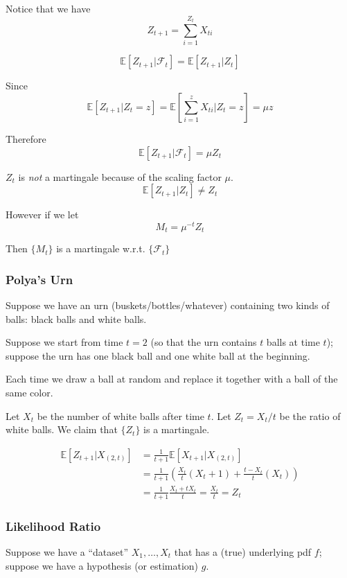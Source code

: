         Notice that we have
        \[ Z_{t+1} = \sum_{i=1}^{Z_t}X_{ti} \]

        \[ \mathbb{E}[Z_{t+1}|\mathcal{F}_t] = \mathbb{E}[Z_{t+1}|Z_t] \]

        Since
        \[ \mathbb{E}[Z_{t+1}|Z_t=z] = \mathbb{E}[\sum_{i=1}^zX_{ti}|Z_t=z] = \mu z \]

        Therefore
        \[ \mathbb{E}[Z_{t+1}|\mathcal{F}_t] = \mu Z_t \]

        $Z_t$ is \emph{not} a martingale because of the scaling factor $\mu$.
        \[ \mathbb{E}[Z_{t+1}|Z_t] \neq Z_t \]

        However if we let
        \[ M_t = \mu^{-t}Z_t \]

        Then $\{M_t\}$ is a martingale w.r.t. $\{\mathcal{F}_t\}$

        \subsubsection{Polya's Urn}
        Suppose we have an urn (buskets/bottles/whatever) containing two kinds of balls: black balls and white balls.
        
        Suppose we start from time $t=2$ (so that the urn contains $t$ balls at time $t$); suppose the urn has one black ball and one white ball at the beginning.
        
        Each time we draw a ball at random and replace it together with a ball of the same color.

        Let $X_t$ be the number of white balls after time $t$. Let $Z_t = X_t/t$ be the ratio of white balls. We claim that $\{Z_t\}$ is a martingale.

        \begin{align*}
            \mathbb{E}\left[Z_{t+1}|X_{(2,t)}\right] &= \frac{1}{t+1}\mathbb{E}[X_{t+1}|X_{(2,t)}]\\
            &= \frac{1}{t+1}\left(\frac{X_t}{t}\left(X_t+1\right) + \frac{t-X_t}{t}\left(X_t\right)\right)\\
            &= \frac{1}{t+1}\frac{X_t + tX_t}{t} = \frac{X_t}{t} = Z_t
        \end{align*}

        \subsubsection{Likelihood Ratio}
        Suppose we have a ``dataset'' $X_1,\dots,X_t$ that has a (true) underlying pdf $f$; suppose we have a hypothesis (or estimation) $g$.

